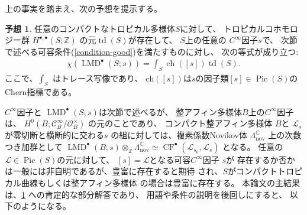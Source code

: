 \documentclass[uplatex,dvipdfmx,12pt]{jsarticle}
\numberwithin{equation}{section}
\theoremstyle{definition}
\newtheorem{conjecture}[theorem]{予想}
\newcommand{\opn}[1]{\operatorname{#1}}
\begin{document}

上の事実を踏まえ、次の予想を提示する。

\begin{conjecture} \label{conjecture-mirror-tropical-rr}
任意のコンパクトなトロピカル多様体$S$に対して、
トロピカルコホモロジー群 $H^{\bullet,\bullet}(S;\mathbb{Z})$
の元$\opn{td}(S)$が存在して、
$S$上の任意の
$C^{\infty}$因子$s$で、
次節で述べる可容条件(\cref{condition-good})を満たすものに対し、
次の等式が成り立つ:
\begin{align}
\chi(\opn{LMD}^{\bullet}(S;s))=
\int_{S}\opn{ch}([s])\opn{td}(S).
\end{align}
ここで、$\int_S$ はトレース写像であり、
$\mathrm{ch}([s])$は$s$の因子類$[s]\in \opn{Pic}(S)$の 
Chern指標である。
\end{conjecture}
$C^{\infty}$因子と
$\opn{LMD}^{\bullet}(S;s)$は次節で述べるが、
整アフィン多様体$B$上の$C^{\infty}$因子は、
$H^{0}(B;\mathcal{C}_{B}^{\infty}/\mathcal{O}^{\times}_B)$
の元のことであり、
コンパクト整アフィン多様体 $B$と
$\mathscr{L}_s$が零切断と横断的に交わる$s$
の組に対しては、複素係数Novikov体 
$\Lambda^{\mathbb{C}}_{\mathrm{nov}}$
上の次数つき加群として
$\opn{LMD}^{\bullet}(B;s)\otimes_{\mathbb{Z}}
\Lambda^{\mathbb{C}}_{\mathrm{nov}}\simeq
\opn{CF}^{\bullet}(\mathscr{L}_{s_0},
\mathscr{L}_s)$ となる。
任意の$\mathcal{L}\in\opn{Pic}(S)$の元に対して、
$[s]=\mathcal{L}$となる可容$C^{\infty}$因子
$s$が
存在するか否かは一般には非自明であるが、豊富に存在すると期待
され、$S$がコンパクトトロピカル曲線もしくは整アフィン多様体
の場合は豊富に存在する。
本論文の主結果は、\cref{conjecture-mirror-tropical-rr}
への肯定的な部分解答であり、
用語や条件の説明を後回しにすると、
以下のようになる。
\end{document}
